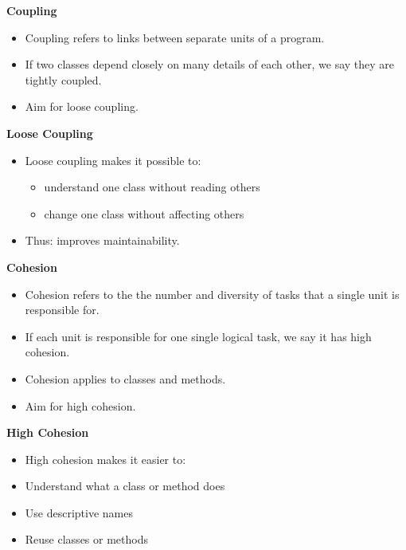 \documentclass{beamer}
\begin{document}
\begin{frame}
\begin{center}
\textbf{Coupling}
\end{center}
\begin{itemize}
\item Coupling refers to links between separate units of a program.
\item If two classes depend closely on many details of each other, we say they are tightly coupled.
\item Aim for loose coupling.
\end{itemize}
\end{frame}

\begin{frame}
\begin{center}
\textbf{Loose Coupling}
\end{center}
\begin{itemize}
\item Loose coupling makes it possible to:
\begin{itemize}
\item understand one class without reading others
\item change one class without affecting others
\end{itemize}
\item Thus: improves maintainability.
\end{itemize}
\end{frame}

\begin{frame}
\begin{center}
\textbf{Cohesion}
\end{center}
\begin{itemize}
\item Cohesion refers to the the number and diversity of tasks that a single unit is responsible for.
\item If each unit is responsible for one single logical task, we say it has high cohesion.
\item Cohesion applies to classes and methods. 
\item Aim for high cohesion.
\end{itemize}
\end{frame}

\begin{frame}
\begin{center}
\textbf{High Cohesion}
\end{center}
\begin{itemize}
\item High cohesion makes it easier to:
\bigskip
\item Understand what a class or method does
\item Use descriptive names
\item Reuse classes or methods
\end{itemize}
\end{frame}
\end{document}
